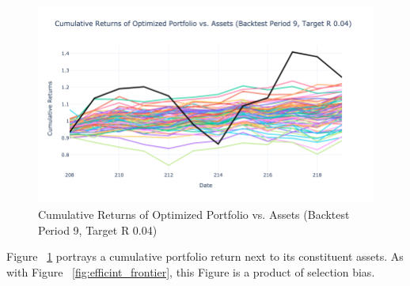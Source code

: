 \documentclass[12pt,twoside]{article}
\begin{document}
\begin{figure}[]
\centering %
\includegraphics[width = 1.0\hsize]{./figures/Cumulative_Rets.png} %
\caption{Cumulative Returns of Optimized Portfolio vs. Assets (Backtest Period 9, Target R 0.04)}
\label{fig:Cumulative_Rets}
\end{figure}

Figure ~\ref{fig:Cumulative_Rets} portrays a cumulative portfolio return next to its constituent assets. As with Figure ~\ref{fig:efficint_frontier}, this Figure is a product of selection bias.
\end{document}
